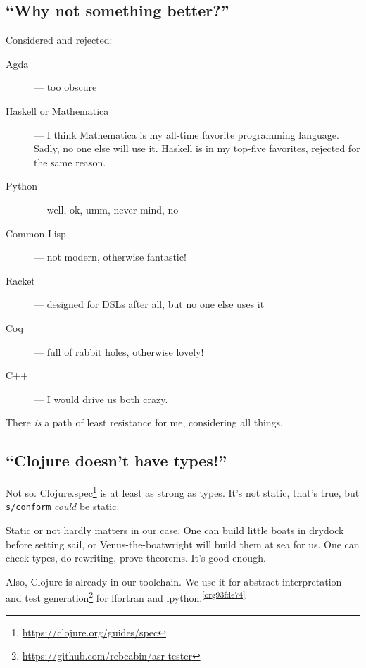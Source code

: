 \documentclass[10pt,oneside,x11names]{article}
\theoremstyle{definition}
\theoremstyle{warning}
\begin{document}
\subsection{``Why not something better?''}
\label{sec:org93e36f4}

Considered and rejected:

\begin{description}
\item[{Agda}] --- too obscure

\item[{Haskell or Mathematica}] --- I think Mathematica is my all-time
favorite programming language. Sadly, no one else will use it.
Haskell is in my top-five favorites, rejected for the same reason.

\item[{Python}] --- well, ok, umm, never mind, no

\item[{Common Lisp}] --- not modern, otherwise fantastic!

\item[{Racket}] --- designed for DSLs after all, but no one else uses it

\item[{Coq}] --- full of rabbit holes, otherwise lovely!

\item[{C++}] --- I would drive us both crazy.
\end{description}

There \emph{is} a path of least resistance for me, considering all
things.

\subsection{``Clojure doesn't have types!''}
\label{sec:orgf82ceed}

Not so. Clojure.spec\footnote{\url{https://clojure.org/guides/spec}} is at
least as strong as types. It's not static, that's true, but
\texttt{s/conform} \emph{could} be static.

Static or not hardly matters in our case. One can build little
boats in drydock before setting sail, or Venus-the-boatwright will
build them at sea for us. One can check types, do rewriting,
prove theorems. It's good enough.

Also, Clojure is already in our toolchain. We use it for abstract
interpretation and test generation\footnote{\url{https://github.com/rebcabin/asr-tester}}
for lfortran and lpython.\textsuperscript{\ref{org93fde74}}
\end{document}
